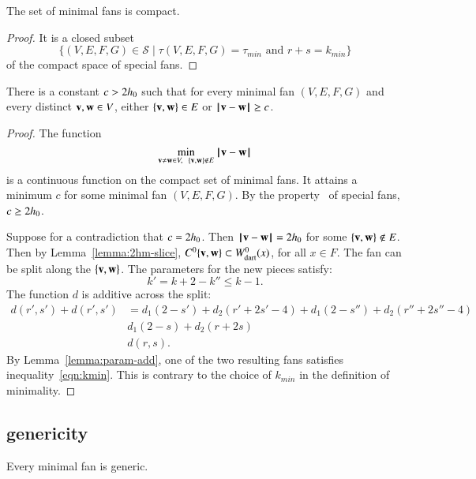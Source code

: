 \begin{lemma}
The set of minimal fans is compact.
\end{lemma}

\begin{proof}  It is a closed subset
$$
\{(V,E,F,G)\in {\mathcal S} \mid \tau(V,E,F,G)=\tau_{min} \text{ and }
   r+s = k_{min}\}
$$ 
 of the compact space of special fans.
\end{proof}


\begin{lemma}
There is a constant $c>2{h_0}$ such that for every minimal fan $(V,E,F,G)$
and every distinct ${\mathbf v},{\mathbf w}\in V$, either $\{{\mathbf v},{\mathbf w}\}\in E$ or ${\hskip0.1em|\hskip-0.15em|\hskip0.1em}{\mathbf v} - {\mathbf w}{\hskip0.1em|\hskip-0.15em|\hskip0.1em}\ge c$.
\end{lemma}

\begin{proof} The function
$$
\min_{{\mathbf v}\ne {\mathbf w}\in V,~~\{{\mathbf v},{\mathbf w}\}\not\in E} {\hskip0.1em|\hskip-0.15em|\hskip0.1em}{\mathbf v} - {\mathbf w}{\hskip0.1em|\hskip-0.15em|\hskip0.1em}
$$
is a continuous function on the compact set of minimal fans.
It attains a minimum $c$ for some minimal fan $(V,E,F,G)$.  By the property~ of special fans, $c\ge 2{h_0}$.

Suppose for a contradiction that $c=2{h_0}$.  Then ${\hskip0.1em|\hskip-0.15em|\hskip0.1em}{\mathbf v} - {\mathbf w}{\hskip0.1em|\hskip-0.15em|\hskip0.1em}=2{h_0}$ for
some $\{{\mathbf v},{\mathbf w}\}\not\in E$.  Then by Lemma~\ref{lemma:2hm-slice}, $C^0\{{\mathbf v},{\mathbf w}\}\subset W^0_{\text{dart}}(x)$, for all $x\in F$.
The fan can be split along the $\{{\mathbf v},{\mathbf w}\}$.  
The parameters for the new pieces satisfy:
$$
k' = k+2 - k'' \le k-1.
$$
The function $d$ is additive across the split:
\begin{equation}\label{eqn:drs}
\begin{array}{lll}
d(r',s') + d(r',s') &= d_1 (2-s') + d_2 (r'+2 s'-4) + d_1 (2-s'') + d_2 (r''+2s''-4)\\
   & d_1 (2 - s) + d_2 (r + 2 s) \\
   & d(r,s).
\end{array}
\end{equation}
By Lemma~\ref{lemma:param-add}, one of the two resulting fans satisfies inequality~\ref{eqn:kmin}.  This is contrary to the choice of $k_{min}$ in the definition of minimality.
\end{proof}





\subsection{genericity}

\begin{lemma}\label{lemma:circular-nonmin}
Every minimal fan is generic.
\end{lemma}

